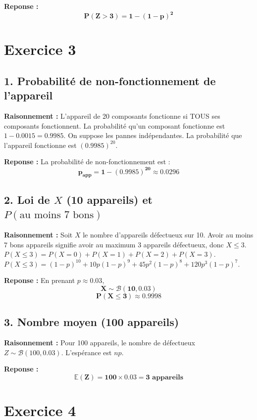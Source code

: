 \documentclass[11pt,a4paper]{article}
\begin{document}
\textbf{Reponse :}
$$
\mathbf{P(Z>3) = 1 - (1-p)^2}
$$

\hrulefill

\section*{Exercice 3}

\subsection*{1. Probabilité de non-fonctionnement de l'appareil}

\textbf{Raisonnement :} L'appareil de 20 composants fonctionne si TOUS ses composants fonctionnent. La probabilité qu'un composant fonctionne est $1 - 0.0015 = 0.9985$. On suppose les pannes indépendantes. La probabilité que l'appareil fonctionne est $(0.9985)^{20}$.

\textbf{Reponse :} La probabilité de non-fonctionnement est :
$$
\mathbf{p_{app} = 1 - (0.9985)^{20} \approx 0.0296}
$$

\subsection*{2. Loi de $X$ (10 appareils) et $P(\text{au moins 7 bons})$}

\textbf{Raisonnement :} Soit $X$ le nombre d'appareils défectueux sur 10. Avoir au moins 7 bons appareils signifie avoir au maximum 3 appareils défectueux, donc $X \le 3$.
$P(X \le 3) = P(X=0) + P(X=1) + P(X=2) + P(X=3)$.
$P(X \le 3) = (1-p)^{10} + 10p(1-p)^9 + 45p^2(1-p)^8 + 120p^3(1-p)^7$.

\textbf{Reponse :} En prenant $p \approx 0.03$,
$$
\mathbf{X \sim \mathcal{B}(10, 0.03)}
$$
$$
\mathbf{P(X \le 3) \approx 0.9998}
$$

\subsection*{3. Nombre moyen (100 appareils)}

\textbf{Raisonnement :} Pour 100 appareils, le nombre de défectueux $Z \sim \mathcal{B}(100, 0.03)$. L'espérance est $np$.

\textbf{Reponse :} 
$$
\mathbf{\mathbb{E}(Z) = 100 \times 0.03 = 3 \text{ appareils}}
$$

\hrulefill

\section*{Exercice 4}
\end{document}
